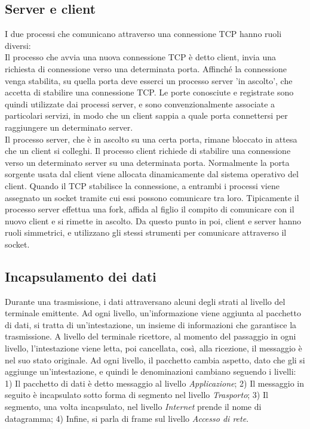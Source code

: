 \documentclass[12pt, a4paper, oneside]{book}
\begin{document}
\subsection{Server e client}
I due processi che comunicano attraverso una connessione TCP hanno ruoli diversi:
\\Il processo che avvia una nuova connessione TCP è detto client, invia una richiesta di connessione verso una determinata porta.
Affinché la connessione venga stabilita, su quella porta deve esserci un processo server 'in ascolto', che accetta di stabilire una connessione TCP.
Le porte conosciute e registrate sono quindi utilizzate dai processi server, e sono convenzionalmente associate a particolari servizi, in modo che un client sappia a quale porta connettersi per raggiungere un determinato server.
\\Il processo server, che è in ascolto su una certa porta, rimane bloccato in attesa che un client si colleghi. Il processo client richiede di stabilire una connessione verso un determinato server su una determinata porta. Normalmente la porta sorgente usata dal client viene allocata dinamicamente dal sistema operativo del client. Quando il TCP stabilisce la connessione, a entrambi i processi viene assegnato un socket tramite cui essi possono comunicare tra loro. Tipicamente il processo server effettua una fork, affida al figlio il compito di comunicare con il nuovo client e si rimette in ascolto. Da questo punto in poi, client e server hanno ruoli simmetrici, e utilizzano gli stessi strumenti per comunicare attraverso il socket.
\subsection{Incapsulamento dei dati}
Durante una trasmissione, i dati attraversano alcuni degli strati al livello del terminale emittente. Ad ogni livello, un'informazione viene aggiunta al pacchetto di dati, si tratta di un'intestazione, un insieme di informazioni che garantisce la trasmissione. A livello del terminale ricettore, al momento del passaggio in ogni livello, l'intestazione viene letta, poi cancellata, così, alla ricezione, il messaggio è nel suo stato originale. Ad ogni livello, il pacchetto cambia aspetto, dato che gli si aggiunge un'intestazione, e quindi le denominazioni cambiano seguendo i livelli: 1) Il pacchetto di dati è detto messaggio al livello \textit{Applicazione}; 2) Il messaggio in seguito è incapsulato sotto forma di segmento nel livello \textit{Trasporto}; 3) Il segmento, una volta incapsulato, nel livello \textit{Internet} prende il nome di datagramma; 4) Infine, si parla di frame sul livello \textit{Accesso di rete}.
\end{document}
